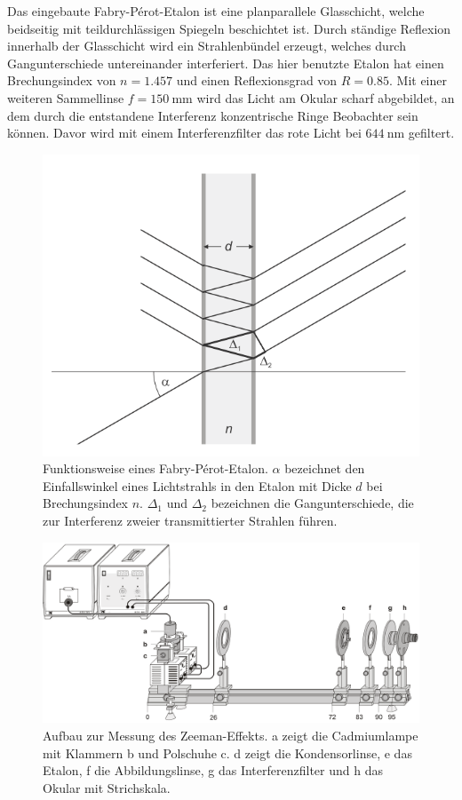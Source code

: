 Das eingebaute Fabry-P\'erot-Etalon ist eine planparallele Glasschicht, welche 
beidseitig mit teildurchlässigen Spiegeln beschichtet ist. Durch ständige Reflexion innerhalb der Glasschicht
wird ein Strahlenbündel erzeugt, welches durch Gangunterschiede untereinander interferiert. 
Das hier benutzte Etalon hat einen Brechungsindex von $n=1.457$ und einen Reflexionsgrad von $R=0.85$.
Mit einer weiteren Sammellinse $f=\SI{150}{\mm}$ wird das Licht am Okular scharf abgebildet, an 
dem durch die entstandene Interferenz konzentrische Ringe Beobachter sein können. Davor wird mit einem 
Interferenzfilter das rote Licht bei $\SI{644}{\nm}$ gefiltert.

\begin{figure}[h]
    \centering
    \includegraphics[width=0.6\linewidth]{../figs/etalon}
    \caption{Funktionsweise eines Fabry-P\'erot-Etalon. $\alpha$ bezeichnet den Einfallswinkel 
        eines Lichtstrahls in den Etalon mit Dicke $d$ bei Brechungsindex $n$.
        $\Delta_1$ und $\Delta_2$ bezeichnen die Gangunterschiede, die zur Interferenz zweier 
        transmittierter Strahlen führen.
        \cite{zeeman_handblatt}}
    \label{fig:etalon}
\end{figure}

\begin{figure}[h]
    \centering
    \includegraphics[width=0.7\linewidth]{../figs/zeeman_aufbau}
    \caption{Aufbau zur Messung des Zeeman-Effekts. \abf a zeigt die Cadmiumlampe mit Klammern
        \abf b und Polschuhe \abf c. \abf d zeigt die Kondensorlinse, \abf e das Etalon, \abf f 
        die Abbildungslinse, \abf g das Interferenzfilter und \abf h das Okular mit Strichskala. 
        \cite{zeeman_handblatt}}
    \label{fig:zeeman_aufbau}
\end{figure}


